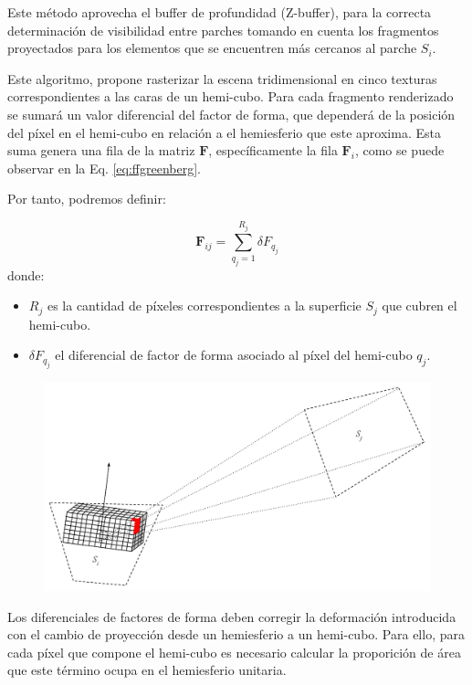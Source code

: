 Este método aprovecha el buffer de profundidad (Z-buffer), para la correcta determinación de visibilidad entre parches tomando en cuenta los fragmentos proyectados para los elementos que se encuentren más cercanos al parche $S_{i}$.

Este algoritmo, propone rasterizar la escena tridimensional en cinco texturas correspondientes a las caras de un hemi-cubo. Para cada fragmento renderizado se sumará un valor diferencial del factor de forma, que dependerá de la posición del píxel en el hemi-cubo en relación a el hemiesferio que este aproxima.  Esta suma genera una fila de la matriz $\mathbf{F}$, específicamente la fila $\mathbf{F}_{i}$, como se puede observar en la Eq. \eqref{eq:ffgreenberg}.

Por tanto, podremos definir:

\begin{equation}
	\mathbf{F}_{ij} = \sum_{q_{j}=1}^{R_{j}} \delta{F_{q_{j}}}
	\label{eq:ffgreenberg}
\end{equation}
donde:
\begin{itemize}
	\item $R_{j}$ es la cantidad de píxeles correspondientes a la superficie $S_{j}$ que cubren el hemi-cubo.
	\item $\delta{F_{q_{j}}}$ el diferencial de factor de forma asociado al píxel del hemi-cubo $q_{j}$.
\end{itemize}

\vspace{5mm}
\begin{figure}[htbp]
	\centering
	\includegraphics[width=0.8\linewidth]{assets/Hemicube}
	\label{img:ff3}
\end{figure}

Los diferenciales de factores de forma deben corregir la deformación introducida con el cambio de proyección desde un hemiesferio a un hemi-cubo. Para ello, para cada píxel que compone el hemi-cubo es necesario calcular la proporición de área que este término ocupa en el hemiesferio unitaria.

